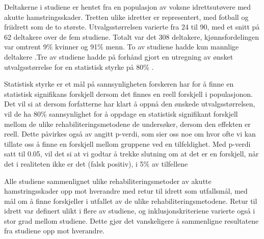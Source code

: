 \documentclass[
]{book}
\begin{document}
Deltakerne i studiene er hentet fra en populasjon av voksne idrettsutøvere med akutte hamstringsskader. Tretten ulike idretter er representert, med fotball og friidrett som de to største. Utvalgsstørrelsen varierte fra 24 til 90, med et snitt på 62 deltakere over de fem studiene. Totalt var det 308 deltakere, kjønnsfordelingen var omtrent 9\% kvinner og 91\% menn. To av studiene hadde kun mannlige deltakere \citep{hickey2020, hamilton2015}.Tre av studiene hadde på forhånd gjort en utregning av ønsket utvalgsstørrelse for en statistisk styrke på 80\% \citep{hickey2020, ahamid2014, hamilton2015}.

Statistisk styrke er et mål på sannsynligheten forskeren har for å finne en statistisk signifikans forskjell dersom det finnes en reell forskjell i populasjonon\citep[\citet{turner2018}]{jones2003}. Det vil si at dersom forfatterne har klart å oppnå den ønskede utvalgsstørrelsen, vil de ha 80\% sannsynlighet for å oppdage en statistisk signifikant forskjell mellom de ulike rehabiliteringsmetodene de undersøker, dersom den effekten er reell. Dette påvirkes også av angitt p-verdi, som sier oss noe om hvor ofte vi kan tillate oss å finne en forskjell mellom gruppene ved en tilfeldighet. Med p-verdi satt til 0.05, vil det si at vi godtar å trekke slutning om at det er en forskjell, når det i realiteten ikke er det (falsk positiv), i 5\% av tilfellene

Alle studiene sammenlignet ulike rehabiliteringsmetoder av akutte hamstringsskader opp mot hverandre med retur til idrett som utfallsmål, med mål om å finne forskjeller i utfallet av de ulike rehabiliteringsmetodene. Retur til idrett var definert ulikt i flere av studiene, og inklusjonskriteriene varierte også i stor grad mellom studiene. Dette gjør det vanskeligere å sammenligne resultatene fra studiene opp mot hverandre.
\end{document}
